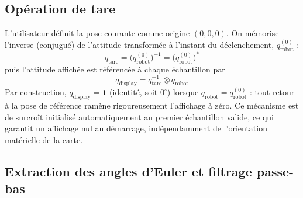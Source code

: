 \documentclass{tropLaClasse}
\begin{document}
\subsection{Opération de tare}
\label{subsec:tare}

L'utilisateur définit la pose courante comme origine $(0,0,0)$. On mémorise l'inverse (conjugué) de l'attitude transformée à l'instant du déclenchement, $q_{\text{robot}}^{(0)}$ :
\begin{equation}
q_{\text{tare}}=\big(q_{\text{robot}}^{(0)}\big)^{-1}=\big(q_{\text{robot}}^{(0)}\big)^{*}
\end{equation}
puis l'attitude affichée est référencée à chaque échantillon par
\begin{equation}
\boxed{\,q_{\text{display}}=q_{\text{tare}}^{-1}\otimes q_{\text{robot}}\,}
\label{eq:qdisplay}
\end{equation}
Par construction, $q_{\text{display}}=\mathbf{1}$ (identité, soit $0^\circ$) lorsque $q_{\text{robot}}=q_{\text{robot}}^{(0)}$ : tout retour à la pose de référence ramène rigoureusement l'affichage à zéro. Ce mécanisme est de surcroît initialisé automatiquement au premier échantillon valide, ce qui garantit un affichage nul au démarrage, indépendamment de l'orientation matérielle de la carte.

\subsection{Extraction des angles d'Euler et filtrage passe-bas}
\label{subsec:extract_filter}
\end{document}
